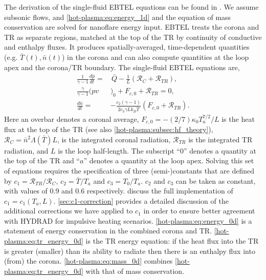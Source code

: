 The derivation of the single-fluid EBTEL equations can be found in \citep{klimchuk_highly_2008,cargill_enthalpy-based_2012}. We assume subsonic flows, and \autoref{hot-plasma:eq:energy_1d} and the equation of mass conservation are solved for nanoflare energy input. EBTEL treats the corona and TR as separate regions, matched at the top of the TR by continuity of conductive and enthalpy fluxes. It produces spatially-averaged, time-dependent quantities (e.g. $\bar{T}(t),\bar{n}(t)$) in the corona and can also compute quantities at the loop apex and the corona/TR boundary. The single-fluid EBTEL equations are,
\begin{align}
    \frac{1}{\gamma - 1}\frac{d\bar{p}}{dt} =& \,\bar{Q} - \frac{1}{L}(\mathcal{R}_C + \mathcal{R}_{TR}), \label{hot-plasma:eq:energy_0d} \\
    \frac{\gamma}{\gamma - 1}(pv&)_0 + F_{c,0} + \mathcal{R}_{TR} = 0, \label{hot-plasma:eq:tr_energy_0d} \\
    \frac{d\bar{n}}{dt} =& -\frac{c_2(\gamma - 1)}{2c_3\gamma Lk_B\bar{T}}(F_{c,0} + \mathcal{R}_{TR}).\label{hot-plasma:eq:mass_0d}
\end{align}
Here an overbar denotes a coronal average, $F_{c,0} = -(2/7)\kappa_0 T_a^{7/2}/L$ is the heat flux at the top of the TR (see also \autoref{hot-plasma:subsec:hf_theory}), $\mathcal{R}_C=\bar{n}^2\Lambda(\bar{T})L$, is the integrated coronal radiation, $\mathcal{R}_{TR}$ is the integrated TR radiation, and $L$ is the loop half-length. The subscript ``0'' denotes a quantity at the top of the TR and ``$a$'' denotes a quantity at the loop apex. Solving this set of equations requires the specification of three (semi-)constants that are defined by  $c_1=\mathcal{R}_{TR}/\mathcal{R}_C$, $c_2=\bar{T}/T_a$ and $c_3=T_0/T_a$. $c_2$ and $c_3$ can be taken as constant, with values of 0.9 and 0.6 respectively. \citet{cargill_enthalpy-based_2012} discuss the full implementation of $c_1 = c_1(T_a,L)$. \autoref{sec:c1-correction} provides a detailed discussion of the additional corrections we have applied to $c_1$ in order to ensure better agreement with HYDRAD for impulsive heating scenarios. \autoref{hot-plasma:eq:energy_0d} is a statement of energy conservation in the combined corona and TR. \autoref{hot-plasma:eq:tr_energy_0d} is the TR energy equation: if the heat flux into the TR is greater (smaller) than its ability to radiate then there is an enthalpy flux into (from) the corona. \autoref{hot-plasma:eq:mass_0d} combines \autoref{hot-plasma:eq:tr_energy_0d} with that of mass conservation.

